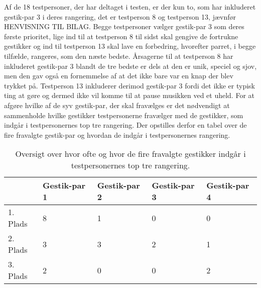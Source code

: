 Af de 18 testpersoner, der har deltaget i testen, er der kun to, som har inkluderet gestik-par 3 i deres rangering, det er testperson 8 og testperson 13, jævnfør HENVISNING TIL BILAG. Begge testpersoner vælger gestik-par 3 som deres første prioritet, lige ind til at testperson 8 til sidst skal gengive de fortrukne gestikker og ind til testperson 13 skal lave en forbedring, hvorefter parret, i begge tilfælde, rangeres, som den næste bedste. Årsagerne til at testperson 8 har inkluderet gestik-par 3 blandt de tre bedste er dels at den er unik, speciel og sjov, men den gav også en fornemmelse af at det ikke bare var en knap der blev trykket på. Testperson 13 inkluderer derimod gestik-par 3 fordi det ikke er typisk ting at gøre og dermed ikke vil komme til at pause musikken ved et uheld.\blankline
%
For at afgøre hvilke af de syv gestik-par, der skal fravælges er det nødvendigt at sammenholde hvilke gestikker testpersonerne fravælger med de gestikker, som indgår i testpersonernes top tre rangering. Der opstilles derfor en tabel over de fire fravalgte gestik-par og hvordan de indgår i testpersonernes rangering.
%
\begin{table}[H]
	\centering
	\begin{tabular}{ | p{2.2cm} | p{2.2cm} | p{2.2cm} | p{2.2cm} | p{2.2cm} |}
	\hline
		 & Gestik-par 1 & Gestik-par 2 & Gestik-par 3 & Gestik-par 4 \\ \hline
		1. Plads & 8 & 1 & 0 & 0\\ \hline
		2. Plads & 3 & 3 & 2 & 1\\ \hline
		3. Plads & 2 & 0 & 0 & 2\\ \hline
	\end{tabular}
	\caption{Oversigt over hvor ofte og hvor de fire fravalgte gestikker indgår i testpersonernes top tre rangering.}
	\label{tab:FravalgteTopTrePause}
\end{table}
\noindent
%
